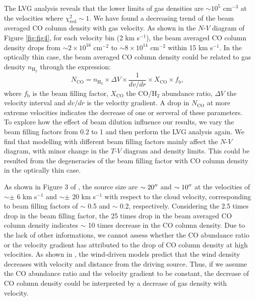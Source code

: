 The LVG analysis reveals that the lower limits of gas densities are $\sim 10^5$ cm$^{-3}$ at the velocities where $\chi^2_{\mathrm{red}} \sim 1$. We have found a decreasing trend of the beam averaged CO column density with gas velocity. As shown in the $N$-$V$ diagram of Figure \ref{fig:fig4}, for each velocity bin (2 km s$^{-1}$), the beam averaged CO column density drops from $\sim 2 \times  10^{16} $ cm$^{-2}$ to $\sim 8 \times 10^{14}$ cm$^{-2}$ within 15 km s$^{-1}$. In the optically thin case, the beam averaged CO column density could be related to gas density $n_{\mathrm{H}_2}$ through the expression: 
\begin{equation}
N_{\mathrm{CO}} = n_{\mathrm{H}_2} \times \Delta V \times \frac{1}{dv/dr} \times X_{\mathrm{CO}} \times f_{\mathrm{b}}, 
\end{equation}
where $f_{\mathrm{b}}$ is the beam filling factor, $X_{\mathrm{CO}}$ the CO/H$_2$ abundance ratio, $\Delta V$ the velocity interval and $dv/dr$ is the velocity gradient. A drop in $N_{\mathrm{CO}}$ at more extreme velocities indicates the decrease of one or serveral of these parameters. 
To explore how the effect of beam dilution influence our results, we vary the beam filling factors from 0.2 to 1 and then perform the LVG analysis again. We find that modelling with different beam filling factors mainly affect the $N$-$V$ diagram, with minor change in the $T$-$V$ diagram and density limits. This could be resulted from the degeneracies of the beam filling factor with CO column density in the optically thin case. 

As shown in Figure 3 of \citet{2009ApJ...696...66Q}, the source size are $\sim 20\mbox{$^{\prime\prime}$}$ and $\sim 10\mbox{$^{\prime\prime}$}$ at the velocities of $\sim \pm$ 6 km s$^{-1}$ and $\sim \pm$ 20 km s$^{-1}$ with respect to the cloud velocity, corresponding to beam filling factors of $\sim$ 0.5 and $\sim$ 0.2, respectively. Considering the 2.5 times drop in the beam filling factor, the 25 times drop in the beam averaged CO column density indicates $\sim$ 10 times decrease in the CO column density. Due to the lack of other informations, we cannot assess whether the CO abundance ratio or the velocity gradient has attributed to the drop of CO column density at high velocities. As shown in \citet{2007prpl.conf..245A}, the wind-driven models predict that the wind density decreases with velocity and distance from the driving source. Thus, if we assume the CO abundance ratio and the velocity gradient to be constant, the decrease of CO column density could be interpreted by a decrease of gas density with velocity.